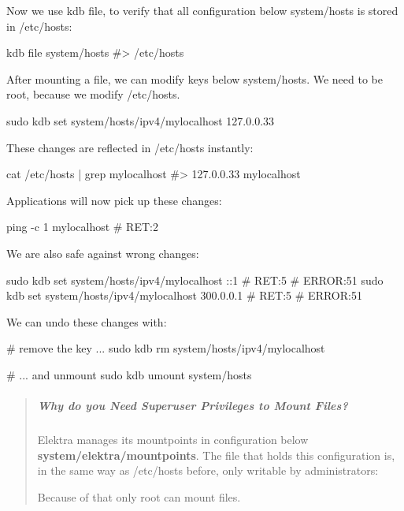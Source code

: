 Now we use {\ttfamily kdb file}, to verify that all configuration below {\ttfamily system/hosts} is stored in {\ttfamily /etc/hosts}\+:


\begin{DoxyCode}
kdb file system/hosts
#> /etc/hosts
\end{DoxyCode}


After mounting a file, we can modify keys below {\ttfamily system/hosts}. We need to be root, because we modify {\ttfamily /etc/hosts}.


\begin{DoxyCode}
sudo kdb set system/hosts/ipv4/mylocalhost 127.0.0.33
\end{DoxyCode}


These changes are reflected in {\ttfamily /etc/hosts} instantly\+:


\begin{DoxyCode}
cat /etc/hosts | grep mylocalhost
#> 127.0.0.33   mylocalhost
\end{DoxyCode}


Applications will now pick up these changes\+:


\begin{DoxyCode}
ping -c 1 mylocalhost
# RET:2
\end{DoxyCode}


We are also safe against wrong changes\+:


\begin{DoxyCode}
sudo kdb set system/hosts/ipv4/mylocalhost ::1
# RET:5
# ERROR:51
sudo kdb set system/hosts/ipv4/mylocalhost 300.0.0.1
# RET:5
# ERROR:51
\end{DoxyCode}


We can undo these changes with\+:


\begin{DoxyCode}
# remove the key ...
sudo kdb rm system/hosts/ipv4/mylocalhost

# ... and unmount
sudo kdb umount system/hosts
\end{DoxyCode}


\begin{quote}
\subparagraph*{Why do you Need Superuser Privileges to Mount Files?}



Elektra manages its mountpoints in configuration below {\bfseries system/elektra/mountpoints}. The file that holds this configuration is, in the same way as {\ttfamily /etc/hosts} before, only writable by administrators\+: 


Because of that only root can mount files. \end{quote}


